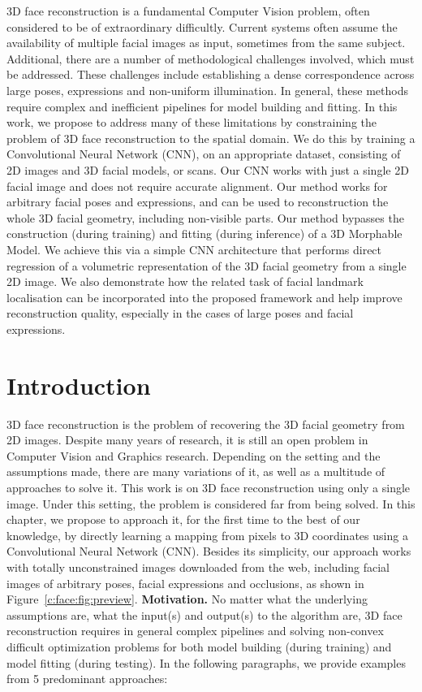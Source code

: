 3D face reconstruction is a fundamental Computer Vision problem, often
considered to be of extraordinary difficultly. Current systems often
assume the availability of multiple facial images as input, sometimes
from the same subject. Additional, there are a number of
methodological challenges involved, which must be addressed. These
challenges include establishing a dense correspondence across large
poses, expressions and non-uniform illumination. In general, these
methods require complex and inefficient pipelines for model building
and fitting. In this work, we propose to address many of these
limitations by constraining the problem of 3D face reconstruction to
the spatial domain. We do this by training a Convolutional Neural
Network (CNN), on an appropriate dataset, consisting of 2D images and
3D facial models, or scans. Our CNN works with just a single 2D facial
image and does not require accurate alignment. Our method works for
arbitrary facial poses and expressions, and can be used to
reconstruction the whole 3D facial geometry, including non-visible
parts. Our method bypasses the construction (during training) and
fitting (during inference) of a 3D Morphable Model. We achieve this via
a simple CNN architecture that performs direct regression of a
volumetric representation of the 3D facial geometry from a single 2D
image. We also demonstrate how the related task of facial landmark
localisation can be incorporated into the proposed framework and help
improve reconstruction quality, especially in the cases of large poses
and facial expressions.


\section{Introduction}
3D face reconstruction is the problem of recovering the 3D facial
geometry from 2D images. Despite many years of research, it is still
an open problem in Computer Vision and Graphics research. Depending on
the setting and the assumptions made, there are many variations of it,
as well as a multitude of approaches to solve it. This work is on 3D
face reconstruction using only a single image. Under this setting, the
problem is considered far from being solved. In this chapter, we
propose to approach it, for the first time to the best of our
knowledge, by directly learning a mapping from pixels to 3D
coordinates using a Convolutional Neural Network (CNN). Besides its
simplicity, our approach works with totally unconstrained images
downloaded from the web, including facial images of arbitrary poses,
facial expressions and occlusions, as shown in
Figure~\ref{c:face:fig:preview}. \newline \textbf{Motivation.} No
matter what the underlying assumptions are, what the input(s) and
output(s) to the algorithm are, 3D face reconstruction requires in
general complex pipelines and solving non-convex difficult
optimization problems for both model building (during training) and
model fitting (during testing). In the following paragraphs, we provide
examples from 5 predominant approaches:

